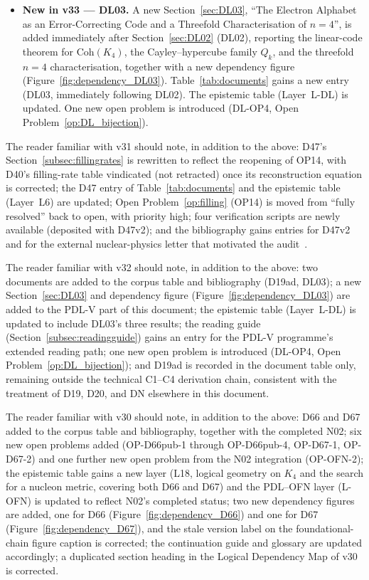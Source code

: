 \documentclass[11pt,a4paper]{article}
\theoremstyle{plain}
\theoremstyle{definition}
\theoremstyle{remark}
\begin{document}
\begin{itemize}
\item \textbf{New in v33 --- DL03.} A new Section~\ref{sec:DL03}, ``The Electron Alphabet as an Error-Correcting Code and a Threefold Characterisation of $n=4$'', is added immediately after Section~\ref{sec:DL02} (DL02), reporting the linear-code theorem for $\mathrm{Coh}(K_4)$, the Cayley--hypercube family $Q_k$, and the threefold $n=4$ characterisation, together with a new dependency figure (Figure~\ref{fig:dependency_DL03}). Table~\ref{tab:documents} gains a new entry (DL03, immediately following DL02). The epistemic table (Layer~L-DL) is updated. One new open problem is introduced (DL-OP4, Open Problem~\ref{op:DL_bijection}).
\end{itemize}

The reader familiar with v31 should note, in addition to the above: D47's Section~\ref{subsec:fillingrates} is rewritten to reflect the reopening of OP14, with D40's filling-rate table vindicated (not retracted) once its reconstruction equation is corrected; the D47 entry of Table~\ref{tab:documents} and the epistemic table (Layer~L6) are updated; Open Problem~\ref{op:filling} (OP14) is moved from ``fully resolved'' back to open, with priority high; four verification scripts are newly available (deposited with D47v2); and the bibliography gains entries for D47v2 and for the external nuclear-physics letter that motivated the audit~\cite{Pigliapoco2026}.

The reader familiar with v32 should note, in addition to the above: two documents are added to the corpus table and bibliography (D19ad, DL03); a new Section~\ref{sec:DL03} and dependency figure (Figure~\ref{fig:dependency_DL03}) are added to the PDL-V part of this document; the epistemic table (Layer~L-DL) is updated to include DL03's three results; the reading guide (Section~\ref{subsec:readingguide}) gains an entry for the PDL-V programme's extended reading path; one new open problem is introduced (DL-OP4, Open Problem~\ref{op:DL_bijection}); and D19ad is recorded in the document table only, remaining outside the technical C1--C4 derivation chain, consistent with the treatment of D19, D20, and DN elsewhere in this document.

The reader familiar with v30 should note, in addition to the above: D66 and D67 added to the corpus table and bibliography, together with the completed N02; six new open problems added (OP-D66pub-1 through OP-D66pub-4, OP-D67-1, OP-D67-2) and one further new open problem from the N02 integration (OP-OFN-2); the epistemic table gains a new layer (L18, logical geometry on $K_4$ and the search for a nucleon metric, covering both D66 and D67) and the PDL--OFN layer (L-OFN) is updated to reflect N02's completed status; two new dependency figures are added, one for D66 (Figure~\ref{fig:dependency_D66}) and one for D67 (Figure~\ref{fig:dependency_D67}), and the stale version label on the foundational-chain figure caption is corrected; the continuation guide and glossary are updated accordingly; a duplicated section heading in the Logical Dependency Map of v30 is corrected.
\end{document}
